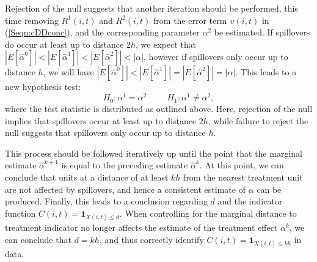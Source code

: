 \documentclass[12pt]{article}
\begin{document}
\begin{spacing}{1.3}
Rejection of the null suggests that another iteration should be performed, this 
time removing $R^1(i,t)$ and $R^2(i,t)$ from the error term $\upsilon(i,t)$ in 
(\ref{Seqn:cDDconc}), and the corresponding parameter $\alpha^2$ be estimated.  
If spillovers do occur at least up to distance $2h$, we expect that 
$|E[\hat\alpha^0]|<|E[\hat\alpha^1]|<|E[\hat\alpha^2]|<|\alpha|$, however if 
spillovers only occur up to distance $h$, we will have 
$|E[\hat\alpha^0]|<|E[\hat\alpha^1]|=|E[\hat\alpha^2]|=|\alpha|$.  This leads 
to a new hypothesis test:
\[
H_0: \alpha^1=\alpha^2 \hspace{1cm}
H_1: \alpha^1\neq\alpha^2,
\]
where the test statistic is distributed as outlined above.  Here, rejection of 
the null implies that spillovers occur at least up to distance $2h$, while 
failure to reject the null suggests that spillovers only occur up to distance 
$h$.

This process should be followed iteratively up until the point that the marginal 
estimate $\hat\alpha^{k+1}$ is equal to the preceding estimate $\hat\alpha^{k}$.  
At this point, we can conclude that units at a distance of at least $kh$ from 
the nearest treatment unit are not affected by spillovers, and hence a 
consistent estimate of $\alpha$ can be produced. Finally, this leads to a 
conclusion regarding $d$ and the indicator function $C(i,t)=\mathbf{1}_{X(i,t)
\leq d}$.  When controlling for the marginal distance to treatment indicator no 
longer affects the estimate of the treatment effect $\alpha^k$, we can conclude 
that $d=kh$, and thus correctly identify $C(i,t)=\mathbf{1}_{X(i,t)\leq kh}$ in 
data.





\end{spacing}
\end{document}
